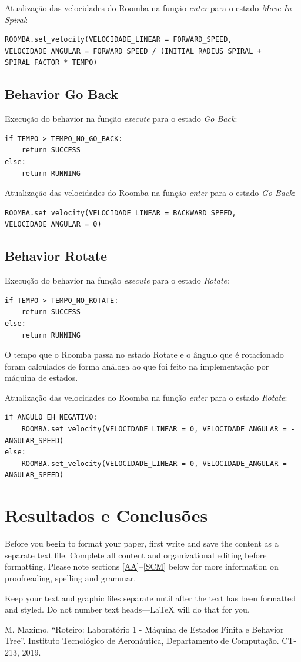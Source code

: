 \documentclass[conference]{IEEEtran}
\begin{document}
Atualização das velocidades do Roomba na função \textit{enter} para o estado \textit{Move In Spiral}:
\begin{lstlisting}
ROOMBA.set_velocity(VELOCIDADE_LINEAR = FORWARD_SPEED, VELOCIDADE_ANGULAR = FORWARD_SPEED / (INITIAL_RADIUS_SPIRAL + SPIRAL_FACTOR * TEMPO)
\end{lstlisting}

\subsection{Behavior Go Back}
Execução do behavior na função \textit{execute} para o estado \textit{Go Back}:
\begin{lstlisting}
if TEMPO > TEMPO_NO_GO_BACK:
	return SUCCESS
else:
	return RUNNING
\end{lstlisting}

Atualização das velocidades do Roomba na função \textit{enter} para o estado \textit{Go Back}:
\begin{lstlisting}
ROOMBA.set_velocity(VELOCIDADE_LINEAR = BACKWARD_SPEED, VELOCIDADE_ANGULAR = 0)
\end{lstlisting}

\subsection{Behavior Rotate}
Execução do behavior na função \textit{execute} para o estado \textit{Rotate}:
\begin{lstlisting}
if TEMPO > TEMPO_NO_ROTATE:
	return SUCCESS
else:
	return RUNNING
\end{lstlisting}

O tempo que o Roomba passa no estado Rotate e o ângulo que é rotacionado foram calculados de forma análoga ao que foi feito na implementação por máquina de estados.

Atualização das velocidades do Roomba na função \textit{enter} para o estado \textit{Rotate}:
\begin{lstlisting}
if ANGULO EH NEGATIVO:
	ROOMBA.set_velocity(VELOCIDADE_LINEAR = 0, VELOCIDADE_ANGULAR = -ANGULAR_SPEED)
else:
	ROOMBA.set_velocity(VELOCIDADE_LINEAR = 0, VELOCIDADE_ANGULAR = ANGULAR_SPEED)
\end{lstlisting}

\section{Resultados e Conclusões}
Before you begin to format your paper, first write and save the content as a 
separate text file. Complete all content and organizational editing before 
formatting. Please note sections \ref{AA}--\ref{SCM} below for more information on 
proofreading, spelling and grammar.

Keep your text and graphic files separate until after the text has been 
formatted and styled. Do not number text heads---{\LaTeX} will do that 
for you.

\begin{thebibliography}{00}
 M. Maximo, ``Roteiro: Laboratório 1 - Máquina de Estados Finita e Behavior Tree''. Instituto Tecnológico de Aeronáutica, Departamento de Computação. CT-213, 2019.
\end{thebibliography}
\end{document}
